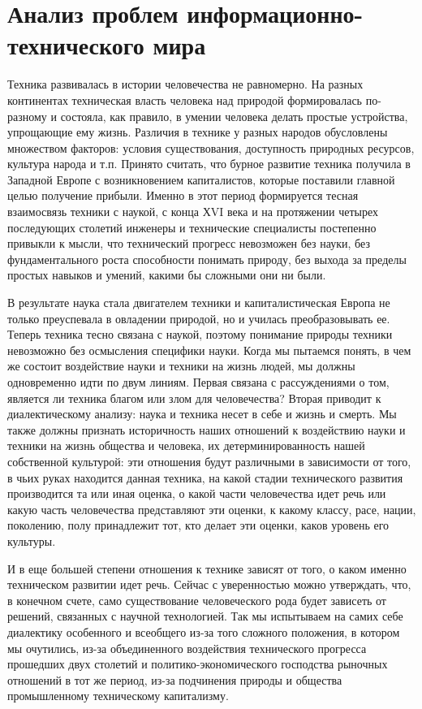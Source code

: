 \section{Анализ проблем информационно-технического мира}

Техника развивалась в истории человечества не равномерно. На разных континентах техническая власть человека над природой формировалась по-разному и состояла, как правило, в умении человека делать простые устройства, упрощающие ему жизнь. Различия в технике у разных народов обусловлены множеством факторов: условия существования, доступность природных ресурсов, культура народа и т.п.  Принято считать, что бурное развитие техника получила в Западной Европе с возникновением капиталистов, которые поставили главной целью получение прибыли. Именно в этот период формируется тесная взаимосвязь техники с наукой, с конца ХVI века и на протяжении четырех последующих столетий инженеры и технические специалисты постепенно привыкли к мысли, что технический прогресс невозможен без науки, без фундаментального роста способности понимать природу, без выхода за пределы простых навыков и умений, какими бы сложными они ни были.

В результате наука стала двигателем техники и капиталистическая Европа не только преуспевала в овладении природой, но и училась преобразовывать ее. Теперь техника тесно связана с наукой, поэтому понимание природы техники невозможно без осмысления специфики науки. Когда мы пытаемся понять, в чем же состоит воздействие науки и техники на жизнь людей, мы должны одновременно идти по двум линиям. Первая связана с рассуждениями о том, является ли техника благом или злом для человечества? Вторая приводит к диалектическому анализу: наука и техника несет в себе и жизнь и смерть. Мы также должны признать историчность наших отношений к воздействию науки и техники на жизнь общества и человека, их детерминированность нашей собственной культурой: эти отношения будут различными в зависимости от того, в чьих руках находится данная техника, на какой стадии технического развития производится та или иная оценка, о какой части человечества идет речь или какую часть человечества представляют эти оценки, к какому классу, расе, нации, поколению, полу принадлежит тот, кто делает эти оценки, каков уровень его культуры.

И в еще большей степени отношения к технике зависят от того, о каком именно техническом развитии идет речь.  Сейчас с уверенностью можно утверждать, что, в конечном счете, само существование человеческого рода будет зависеть от решений, связанных с научной технологией. Так мы испытываем на самих себе диалектику особенного и всеобщего из-за того сложного положения, в котором мы очутились, из-за объединенного воздействия технического прогресса прошедших двух столетий и политико-экономического господства рыночных отношений в тот же период, из-за подчинения природы и общества промышленному техническому капитализму.

